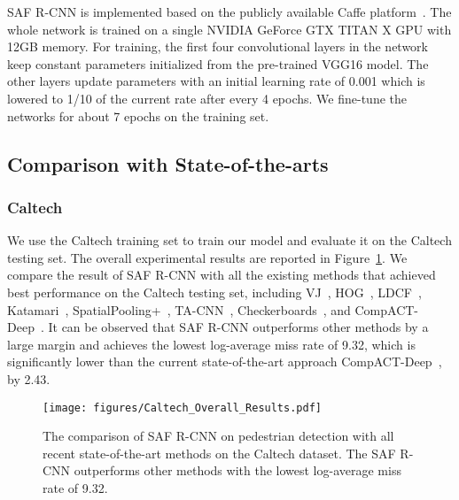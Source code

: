 \documentclass[journal]{IEEEtran}
\begin{document}
SAF R-CNN is implemented based on the publicly available Caffe platform~\cite{jia2014caffe}. The whole network is trained on a single NVIDIA GeForce GTX TITAN X GPU with 12GB memory. For training, the first four convolutional layers in the network keep constant parameters initialized from the pre-trained VGG16 model. The other layers update parameters with an initial learning rate of 0.001 which is lowered to 1/10 of the current rate after every 4 epochs. We fine-tune the networks for about 7 epochs on the training set. 

\subsection{Comparison with State-of-the-arts}
\subsubsection{Caltech}
We use the Caltech training set to train our model and evaluate it on the Caltech testing set. The overall experimental results are reported in Figure~\ref{fig:Caltech_Overall_Results}. We compare the result of SAF R-CNN
with all the existing methods that achieved best performance on the Caltech testing set, including VJ~\cite{viola2004robust}, HOG~\cite{dalal2005histograms}, LDCF~\cite{nam2014local}, Katamari~\cite{benenson2014ten}, SpatialPooling+~\cite{paisitkriangkrai2014strengthening}, TA-CNN~\cite{ta_cnn}, Checkerboards~\cite{zhang2015filtered}, and CompACT-Deep~\cite{compact}. It can be observed that SAF R-CNN outperforms other methods by a large margin and achieves the lowest log-average miss rate of 9.32, which is significantly lower than the current state-of-the-art approach CompACT-Deep~\cite{compact}, by 2.43.

\begin{figure}
	\begin{center}
		\texttt{[image: figures/Caltech\_Overall\_Results.pdf]}
		\caption{{The comparison of SAF R-CNN on pedestrian detection with all recent state-of-the-art methods on the Caltech dataset. The SAF R-CNN outperforms other methods with the lowest log-average miss rate of 9.32.}}
		\label{fig:Caltech_Overall_Results}
	\end{center}
	\vspace{-4mm}
\end{figure}
\end{document}
